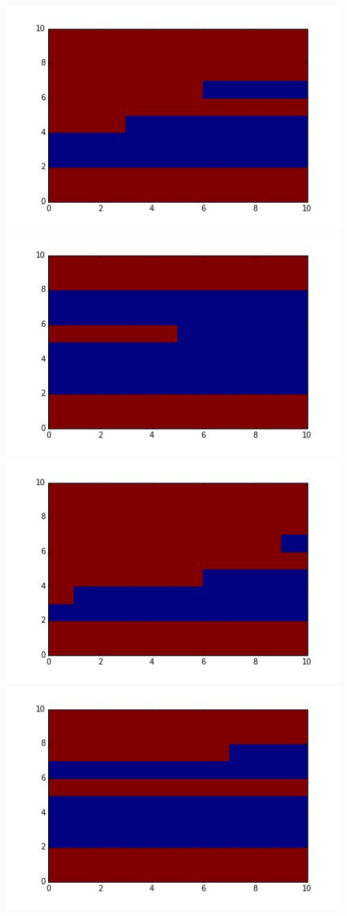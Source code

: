 \documentclass[10pt,a4paper]{article}
\begin{document}
\begin{figure}
	\includegraphics[scale=0.5]{pics/002} \includegraphics[scale=0.5]{pics/009} \\
	\includegraphics[scale=0.5]{pics/003} \includegraphics[scale=0.5]{pics/010} \\

\end{figure}
\end{document}
